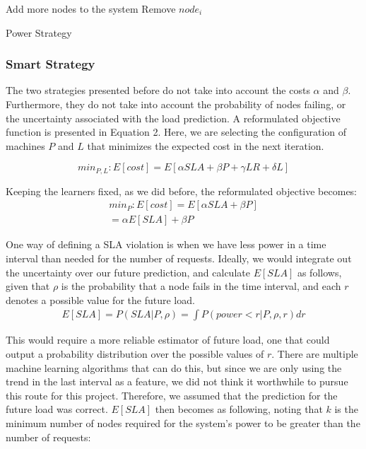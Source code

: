\documentclass[12pt]{article}
\begin{document}
\begin{algorithm}[H]
 {
Add more nodes to the system
}
 {
Remove $node_i$
}
\caption{Power Strategy}
\end{algorithm}

\subsubsection{Smart Strategy}
The two strategies presented before do not take into account the costs
$\alpha$ and $\beta$. Furthermore, they do not take into account the probability
of nodes failing, or the uncertainty associated with the load prediction. A
reformulated objective function is presented in Equation 2. Here, we are
selecting the configuration of machines $P$ and $L$ that minimizes the expected
cost in the next iteration.

\begin{equation}
min_{P,L}: E[cost] = E[\alpha SLA + \beta P + \gamma LR + \delta L]
\end{equation}

Keeping the learners fixed, as we did before, the reformulated objective
becomes:
\begin{eqnarray*}
min_{P}: E[cost] = E[\alpha SLA + \beta P] \\
  = \alpha E[SLA] + \beta P
\end{eqnarray*}

One way of defining a SLA violation is when we have less power in a time
interval than needed for the number of requests. Ideally, we would integrate out
the uncertainty over our future prediction, and calculate $E[SLA]$ as follows,
given that $\rho$ is the probability that a node fails in the time interval, and
each $r$ denotes a possible value for the future load.
\begin{eqnarray*}
E[SLA] = P(SLA | P, \rho) = \int{P(power < r | P, \rho, r)dr}
\end{eqnarray*}

This would require a more reliable estimator of future load, one that could
output a probability distribution over the possible values of $r$. There are
multiple machine learning algorithms that can do this, but since we are only
using the trend in the last interval as a feature, we did not think it
worthwhile to pursue this route for this project. Therefore, we assumed that the
prediction for the future load was correct. $E[SLA]$ then becomes as following,
noting that $k$ is the minimum number of nodes required for the system's power
to be greater than the number of requests:
\end{document}
